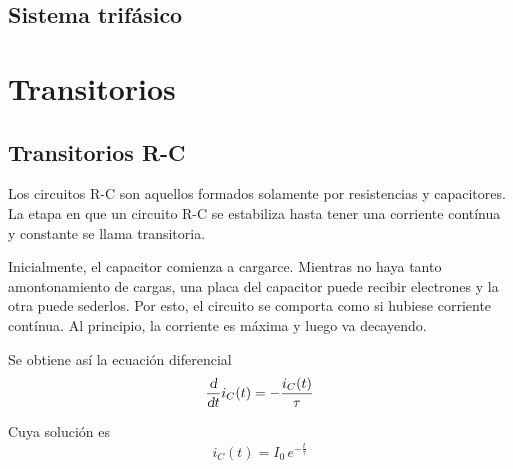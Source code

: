 \documentclass[a5paper,12pt,twoside]{book}
\begin{document}
\subsection*{Sistema trifásico}

\begin{center}
    \def\svgwidth{0.6\linewidth}
    
\end{center}

\begin{center}
    \def\svgwidth{0.8\linewidth}
    
\end{center}

\begin{center}
    \def\svgwidth{0.8\linewidth}
    
\end{center}


\section{Transitorios}


\subsection*{Transitorios R-C}

Los circuitos R-C son aquellos formados solamente por resistencias y capacitores.
La etapa en que un circuito R-C se estabiliza hasta tener una corriente contínua y constante se llama transitoria.

\begin{center}
    \def\svgwidth{0.5\linewidth}
    
\end{center}

Inicialmente, el capacitor comienza a cargarce.
Mientras no haya tanto amontonamiento de cargas, una placa del capacitor puede recibir electrones y la otra puede sederlos.
Por esto, el circuito se comporta como si hubiese corriente contínua.
Al principio, la corriente es máxima y luego va decayendo.

Se obtiene así la ecuación diferencial
\begin{equation*}
    \frac{\textsl{d}}{\textsl{d} t} i_C(t) = - \frac{i_C(t)}{\tau}
\end{equation*}

Cuya solución es
\begin{equation*}
    i_C(t) = I_0 \, e^{-\tfrac{t}{\tau}}
\end{equation*}
\end{document}
